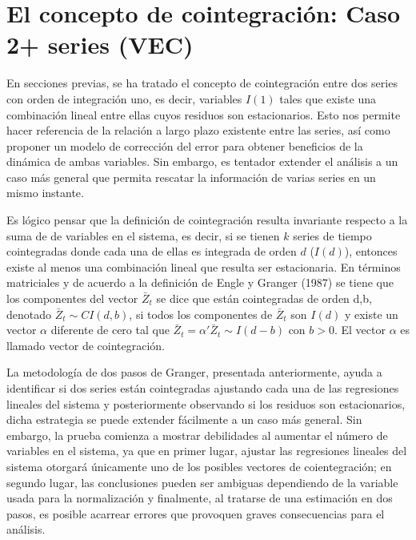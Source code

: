 

\section{El concepto de cointegración: Caso 2+ series (VEC)}

En secciones previas, se ha tratado el concepto de cointegración entre dos series  con orden de integración uno, es decir, variables $I(1)$ tales que existe una combinación lineal entre ellas cuyos residuos son estacionarios. Esto nos permite hacer referencia de la relación a largo plazo  existente entre las series, así como proponer un modelo de corrección del error para obtener beneficios de la dinámica de ambas variables. Sin embargo, es tentador  extender el análisis a un caso más general que permita rescatar la información de varias series en un mismo instante. \bigskip 

Es lógico pensar que la definición de cointegración resulta invariante respecto a la suma de de variables en el sistema, es decir, si se tienen $k$ series de tiempo cointegradas donde cada una de ellas es integrada de orden $d$ ($I(d)$), entonces existe al menos una combinación lineal que resulta ser estacionaria. En términos matriciales y de acuerdo a la definición de Engle y Granger (1987) se tiene que los componentes del vector $\bar{Z}_t$ se dice que están cointegradas de orden d,b, denotado $\bar{Z}_t \sim CI(d,b)$, si todos los componentes de $\bar{Z}_t$ son $I(d)$ y existe un vector $\alpha$ diferente de cero tal que $\bar{Z}_t = \alpha'\bar{Z}_t \sim I(d-b)$ con $b>0$. El vector $\alpha$ es llamado vector de cointegración. \bigskip 


La metodología de dos pasos de Granger, presentada anteriormente, ayuda a identificar si dos series están cointegradas ajustando cada una de las regresiones lineales del sistema y posteriormente observando si los residuos son estacionarios, dicha estrategia se puede extender fácilmente a un caso más general. Sin embargo, la prueba comienza a mostrar debilidades al aumentar el número de variables en el sistema, ya que en primer lugar, ajustar las regresiones lineales del sistema otorgará únicamente uno de los posibles vectores de coientegración; en segundo lugar, las conclusiones pueden ser ambiguas dependiendo de la variable usada para la normalización y finalmente, al tratarse de una estimación en dos pasos, es posible acarrear errores que provoquen graves consecuencias para el análisis.\bigskip 

